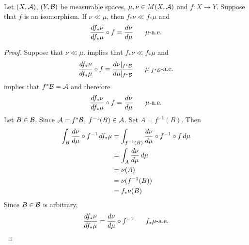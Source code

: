 \documentclass{book}
\begin{document}
	\begin{ex} 
		Let $(X, \mathcal{A})$, $(Y, \mathcal{B})$ be measurable spaces, $\mu, \nu \in M(X, \mathcal{A})$ and $f: X \rightarrow Y$. Suppose that $f$ is an isomorphism. If $\nu \ll \mu$, then $f_*\nu \ll f_*\mu$ and 
		$$\frac{d f_*\nu}{d f_*\mu} \circ f = \frac{d\nu}{d \mu}  \hspace{.5cm} \text{ $\mu$-a.e.}$$ 
	\end{ex}

	\begin{proof}
		Suppose that $\nu \ll \mu$.  implies that $f_*\nu \ll f_*\mu$ and  
		$$\frac{d f_*\nu}{d f_*\mu} \circ f = \frac{d\nu|_{f^* \mathcal{B}}}{d \mu|_{f^*\mathcal{B}}}  \hspace{.5cm} \text{ $\mu|_{f^*\mathcal{B}}$-a.e.}$$
		 implies that $f^*\mathcal{B} = \mathcal{A}$ and therefore
		$$\frac{d f_*\nu}{d f_*\mu} \circ f = \frac{d\nu}{d \mu}  \hspace{.5cm} \text{ $\mu$-a.e.}$$
		Let $B \in \mathcal{B}$. Since $\mathcal{A} = f^*\mathcal{B}$, $f^{-1}(B) \in \mathcal{A}$. Set $A = f^{-1}(B)$. Then
		\begin{align*}
			\int_{B} \frac{d\nu}{d \mu} \circ f^{-1} \, d f_* \mu 
			& = \int_{f^{-1}(B)} \frac{d\nu}{d \mu} \circ f^{-1} \circ f  \, d \mu \\
			& = \int_{A} \frac{d\nu}{d \mu}  \, d \mu \\
			& = \nu(A) \\
			& = \nu(f^{-1}(B)) \\
			& = f_*\nu(B)
		\end{align*}
		Since $B \in \mathcal{B}$ is arbitrary, 
		$$\frac{d f_*\nu}{d f_*\mu}  = \frac{d\nu}{d \mu} \circ f^{-1} \hspace{.5cm} \text{ $f_*\mu$-a.e.}$$
		
	\end{proof}
	
	
	
	
	
	
	
	
	
	
	
	
	
	
	
	
	
	
	
	
	
	
	
	
	
	

	
	
	
	
\end{document}
